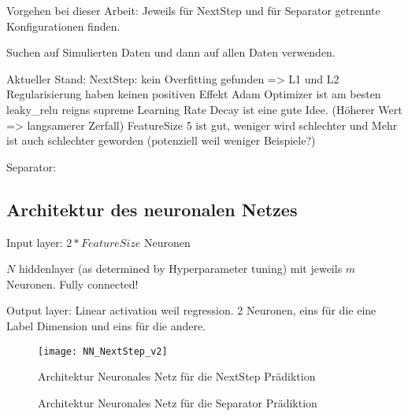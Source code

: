 Vorgehen bei dieser Arbeit: Jeweils für NextStep und für Separator getrennte Konfigurationen finden.

Suchen auf Simulierten Daten und dann auf allen Daten verwenden.



Aktueller Stand:
NextStep: kein Overfitting gefunden => L1 und L2 Regularisierung haben keinen positiven Effekt
Adam Optimizer ist am besten
leaky\_relu reigns supreme
Learning Rate Decay ist eine gute Idee. (Höherer Wert => langsamerer Zerfall)
FeatureSize 5 ist gut, weniger wird schlechter und Mehr ist auch schlechter geworden (potenziell weil weniger Beispiele?)

Separator: 

\subsection{Architektur des neuronalen Netzes}

Input layer: \(2 * FeatureSize\) Neuronen

\(N\) hiddenlayer (as determined by Hyperparameter tuning) mit jeweils \(m\) Neuronen.
Fully connected!

Output layer:
Linear activation weil regression.
2 Neuronen, eins für die eine Label Dimension und eins für die andere.

\begin{figure}
    \centering
	\texttt{[image: NN\_NextStep\_v2]}
	\caption{Architektur Neuronales Netz für die NextStep Prädiktion}
	\label{fig:netArchitectureNextStep}
\end{figure}

\begin{figure}
    \centering
	\caption{Architektur Neuronales Netz für die Separator Prädiktion}
	\label{fig:netArchitectureSep}
\end{figure}
